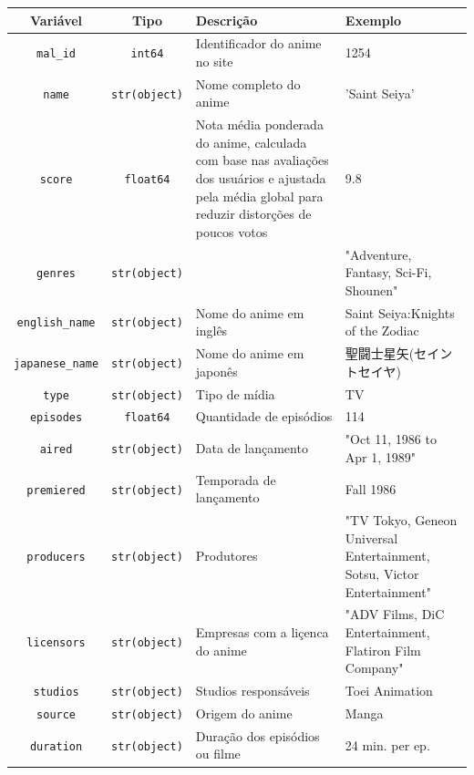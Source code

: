 \begin{table}[h]
    \centering
    \begin{tabular}{|c|c|l|l|}
        \hline
        \textbf{Variável} & \textbf{Tipo} & \textbf{Descrição} & \textbf{Exemplo} \\ \hline
        \texttt{mal_id}  & \texttt{int64}    & Identificador do anime no site & 1254 \\ \hline
        \texttt{name}  & \texttt{str(object)}   & Nome completo do anime & 'Saint Seiya' \\ \hline
        \texttt{score}  & \texttt{float64}    & Nota média ponderada do anime, calculada com base nas avaliações dos usuários e ajustada pela média global para reduzir distorções de poucos votos & 9.8 \\ \hline
        \texttt{genres}  & \texttt{str(object)}    &  & "Adventure, Fantasy, Sci-Fi, Shounen" \\ \hline
        \texttt{english_name}  & \texttt{str(object)}    & Nome do anime em inglês & Saint Seiya:Knights of the Zodiac \\ \hline
        \texttt{japanese_name}  & \texttt{str(object)}    & Nome do anime em japonês & 聖闘士星矢(セイントセイヤ) \\ \hline
        \texttt{type}  & \texttt{str(object)}    & Tipo de mídia & TV \\ \hline
        \texttt{episodes}  & \texttt{float64}    & Quantidade de episódios & 114 \\ \hline
        \texttt{aired}  & \texttt{str(object)}    & Data de lançamento & "Oct 11, 1986 to Apr 1, 1989" \\ \hline
        \texttt{premiered}  & \texttt{str(object)}    & Temporada de lançamento & Fall 1986 \\ \hline
        \texttt{producers}  & \texttt{str(object)}    & Produtores & "TV Tokyo, Geneon Universal Entertainment, Sotsu, Victor Entertainment" \\ \hline
        \texttt{licensors}  & \texttt{str(object)}    & Empresas com a liçenca do anime & "ADV Films, DiC Entertainment, Flatiron Film Company" \\ \hline
        \texttt{studios}  & \texttt{str(object)}    & Studios responsáveis & Toei Animation \\ \hline
        \texttt{source}  & \texttt{str(object)}    & Origem do anime & Manga \\ \hline
        \texttt{duration}  & \texttt{str(object)}    & Duração dos episódios ou filme & 24 min. per ep. \\ \hline

\end{tabular}
\end{table}
